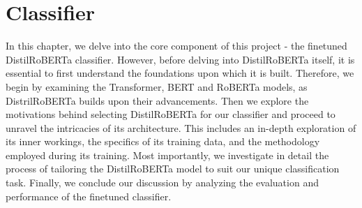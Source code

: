 \documentclass[12pt,oneside,bibtotoc,liststotoc]{scrbook}
\begin{document}
\chapter{Classifier}
In this chapter, we delve into the core component of this project - the finetuned DistilRoBERTa classifier. However, before delving into DistilRoBERTa itself, it is essential to first understand the foundations upon which it is built. Therefore, we begin by examining the Transformer, BERT and RoBERTa models, as DistrilRoBERTa builds upon their advancements. Then we explore the motivations behind selecting DistilRoBERTa for our classifier and proceed to unravel the intricacies of its architecture. This includes an in-depth exploration of its inner workings, the specifics of its training data, and the methodology employed during its training. Most importantly, we investigate in detail the process of tailoring the DistilRoBERTa model to suit our unique classification task. Finally, we conclude our discussion by analyzing the evaluation and performance of the finetuned classifier.
\end{document}
